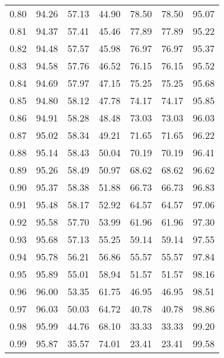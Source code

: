 \begin{tabular}{|c|c|c|c|c|c|c|}
      0.80 &     94.26 &     57.13 &      44.90 &   78.50 &      78.50 &         95.07 \\
      0.81 &     94.37 &     57.41 &      45.46 &   77.89 &      77.89 &         95.22 \\
      0.82 &     94.48 &     57.57 &      45.98 &   76.97 &      76.97 &         95.37 \\
      0.83 &     94.58 &     57.76 &      46.52 &   76.15 &      76.15 &         95.52 \\
      0.84 &     94.69 &     57.97 &      47.15 &   75.25 &      75.25 &         95.68 \\
      0.85 &     94.80 &     58.12 &      47.78 &   74.17 &      74.17 &         95.85 \\
      0.86 &     94.91 &     58.28 &      48.48 &   73.03 &      73.03 &         96.03 \\
      0.87 &     95.02 &     58.34 &      49.21 &   71.65 &      71.65 &         96.22 \\
      0.88 &     95.14 &     58.43 &      50.04 &   70.19 &      70.19 &         96.41 \\
      0.89 &     95.26 &     58.49 &      50.97 &   68.62 &      68.62 &         96.62 \\
      0.90 &     95.37 &     58.38 &      51.88 &   66.73 &      66.73 &         96.83 \\
      0.91 &     95.48 &     58.17 &      52.92 &   64.57 &      64.57 &         97.06 \\
      0.92 &     95.58 &     57.70 &      53.99 &   61.96 &      61.96 &         97.30 \\
      0.93 &     95.68 &     57.13 &      55.25 &   59.14 &      59.14 &         97.55 \\
      0.94 &     95.78 &     56.21 &      56.86 &   55.57 &      55.57 &         97.84 \\
      0.95 &     95.89 &     55.01 &      58.94 &   51.57 &      51.57 &         98.16 \\
      0.96 &     96.00 &     53.35 &      61.75 &   46.95 &      46.95 &         98.51 \\
      0.97 &     96.03 &     50.03 &      64.72 &   40.78 &      40.78 &         98.86 \\
      0.98 &     95.99 &     44.76 &      68.10 &   33.33 &      33.33 &         99.20 \\
      0.99 &     95.87 &     35.57 &      74.01 &   23.41 &      23.41 &         99.58 \\
\bottomrule
\end{tabular}
